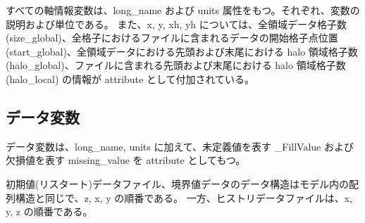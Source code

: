 すべての軸情報変数は、long\_name および units 属性をもつ。それぞれ、変数の説明および単位である。
また、x, y, xh, yh については、全領域データ格子数(size\_global)、全格子におけるファイルに含まれるデータの開始格子点位置(start\_global)、全領域データにおける先頭および末尾における halo 領域格子数 (halo\_global)、ファイルに含まれる先頭および末尾における halo 領域格子数 (halo\_local) の情報が attribute として付加されている。



\subsection{データ変数}
データ変数は、long\_name, units に加えて、未定義値を表す \_FillValue および欠損値を表す missing\_value を attribute としてもつ。

初期値(リスタート)データファイル、境界値データのデータ構造はモデル内の配列構造と同じで、z, x, y の順番である。
一方、ヒストリデータファイルは、x, y, z の順番である。

